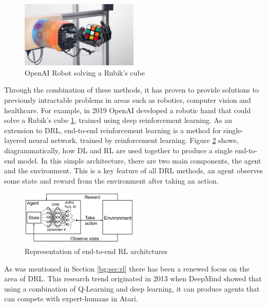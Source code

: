 \begin{figure}[htbp]
	\centering
	\includegraphics[width=0.5\textwidth]{chapters/chapter2/images/openai-robot.jpg}
	\caption{OpenAI Robot solving a Rubik's cube
		\label{fig:openai-robot}
	}
\end{figure}

Through the combination of these methods, it has proven to provide solutions to previously intractable problems \cite{rl-survey} in areas such as robotics, computer vision and healthcare. For example, in 2019 OpenAI developed a robotic hand that could solve a Rubik's cube \ref{fig:openai-robot}, trained using deep reinforcement learning. As an extension to DRL, end-to-end reinforcement learning is a method for single-layered neural network, trained by reinforcement learning. Figure \ref{fig:e2e-rl} shows, diagrammatically, how DL and RL are used together to produce a single end-to-end model. In this simple architecture, there are two main components, the agent and the environment. This is a key feature of all DRL methods, an agent observes some state and reward from the environment after taking an action.

\begin{figure}[htbp]
	\centering
	\includegraphics[width=0.5\textwidth]{chapters/chapter2/images/e2e-rl.jpg}
	\caption{Representation of end-to-end RL architctures
		\label{fig:e2e-rl}
	}
\end{figure}

As was mentioned in Section \ref{bg:sec:rl} there has been a renewed focus on the area of DRL. This research trend originated in 2013 when DeepMind showed that using a combination of Q-Learning and deep learning, it can produce agents that can compete with expert-humans in Atari.

